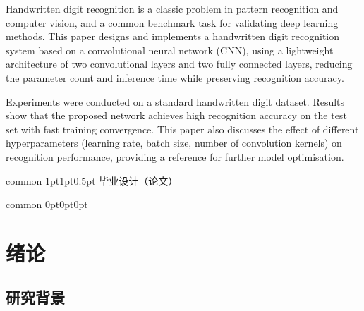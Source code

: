 \documentclass[report,oneside,UTF8,zihao=-4]{config}
\begin{document}
\begin{abstractEN}[3]

Handwritten digit recognition is a classic problem in pattern recognition and computer vision, and a common benchmark task for validating deep learning methods. This paper designs and implements a handwritten digit recognition system based on a convolutional neural network (CNN), using a lightweight architecture of two convolutional layers and two fully connected layers, reducing the parameter count and inference time while preserving recognition accuracy.

Experiments were conducted on a standard handwritten digit dataset. Results show that the proposed network achieves high recognition accuracy on the test set with fast training convergence. This paper also discusses the effect of different hyperparameters (learning rate, batch size, number of convolution kernels) on recognition performance, providing a reference for further model optimisation.

\def\keywordsEN{convolutional neural network, handwritten digit recognition, deep learning, pattern recognition}

\end{abstractEN}




\Header
    {common}
    {1pt}{1pt}{0.5pt}
    {毕业设计（论文）}
    {}
    {\currentChapterInfo}

\Footer
    {common}
    {0pt}{0pt}{0pt}
    {}
    {\thepage}
    {}



\chapter{绪论}

\section{研究背景}
\end{document}

